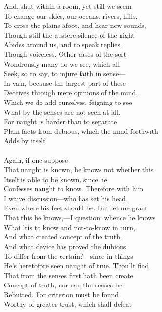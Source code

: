 And, shut within a room, yet still we seem\\
To change our skies, our oceans, rivers, hills,\\
To cross the plains afoot, and hear new sounds,\\
Though still the austere silence of the night\\
Abides around us, and to speak replies,\\
Though voiceless. Other cases of the sort\\
Wondrously many do we see, which all\\
Seek, so to say, to injure faith in sense—\\
In vain, because the largest part of these\\
Deceives through mere opinions of the mind,\\
Which we do add ourselves, feigning to see\\
What by the senses are not seen at all.\\
For naught is harder than to separate\\
Plain facts from dubious, which the mind forthwith\\
Adds by itself.\\
\\
Again, if one suppose\\
That naught is known, he knows not whether this\\
Itself is able to be known, since he\\
Confesses naught to know. Therefore with him\\
I waive discussion—who has set his head\\
Even where his feet should be. But let me grant\\
That this he knows,—I question: whence he knows\\
What 'tis to know and not-to-know in turn,\\
And what created concept of the truth,\\
And what device has proved the dubious\\
To differ from the certain?—since in things\\
He's heretofore seen naught of true. Thou'lt find\\
That from the senses first hath been create\\
Concept of truth, nor can the senses be\\
Rebutted. For criterion must be found\\
Worthy of greater trust, which shall defeat\\
